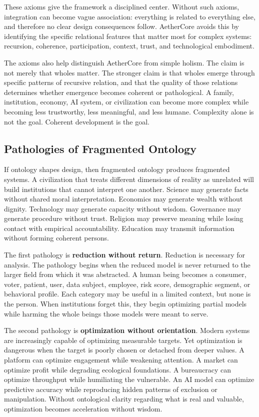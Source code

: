 \documentclass[12pt]{article}
\begin{document}
These axioms give the framework a disciplined center. Without such axioms, integration can become vague association: everything is related to everything else, and therefore no clear design consequences follow. AetherCore avoids this by identifying the specific relational features that matter most for complex systems: recursion, coherence, participation, context, trust, and technological embodiment.

The axioms also help distinguish AetherCore from simple holism. The claim is not merely that wholes matter. The stronger claim is that wholes emerge through specific patterns of recursive relation, and that the quality of those relations determines whether emergence becomes coherent or pathological. A family, institution, economy, AI system, or civilization can become more complex while becoming less trustworthy, less meaningful, and less humane. Complexity alone is not the goal. Coherent development is the goal.

\subsection{Pathologies of Fragmented Ontology}

If ontology shapes design, then fragmented ontology produces fragmented systems. A civilization that treats different dimensions of reality as unrelated will build institutions that cannot interpret one another. Science may generate facts without shared moral interpretation. Economics may generate wealth without dignity. Technology may generate capacity without wisdom. Governance may generate procedure without trust. Religion may preserve meaning while losing contact with empirical accountability. Education may transmit information without forming coherent persons.

The first pathology is \textbf{reduction without return}. Reduction is necessary for analysis. The pathology begins when the reduced model is never returned to the larger field from which it was abstracted. A human being becomes a consumer, voter, patient, user, data subject, employee, risk score, demographic segment, or behavioral profile. Each category may be useful in a limited context, but none is the person. When institutions forget this, they begin optimizing partial models while harming the whole beings those models were meant to serve.

The second pathology is \textbf{optimization without orientation}. Modern systems are increasingly capable of optimizing measurable targets. Yet optimization is dangerous when the target is poorly chosen or detached from deeper values. A platform can optimize engagement while weakening attention. A market can optimize profit while degrading ecological foundations. A bureaucracy can optimize throughput while humiliating the vulnerable. An AI model can optimize predictive accuracy while reproducing hidden patterns of exclusion or manipulation. Without ontological clarity regarding what is real and valuable, optimization becomes acceleration without wisdom.
\end{document}
